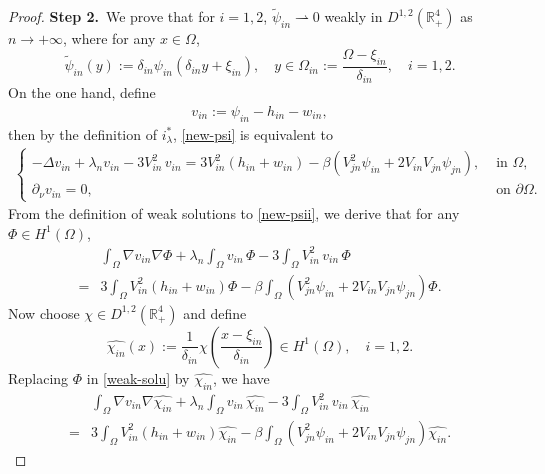 \documentclass[a4paper,reqno,11pt,oneside]{amsart}
\numberwithin{equation}{section}
\newcommand{\R}{\mathbb{R}}
\begin{document}
\begin{proof}
{\textbf{Step 2.}~We prove that  for $i=1,2$, \( \widetilde{\psi}_{in}\rightharpoonup 0 \) weakly in \(D^{1,2}(\R^4_{+})\) as $n \rightarrow+\infty$, where for any $x\in\Omega$,
$$
    \label{trans}\widetilde{\psi}_{in}(y):=\delta_{in}\psi_{in}\left(\delta_{in} y+\xi_{in}\right),\quad y\in\Omega_{in}:=\frac{\Omega-\xi_{in}}{\delta_{in}},\quad i=1,2.
$$ }
On the one hand, define \begin{align}
    \label{def-vn}v_{in}:=\psi_{in}-h_{in}-w_{in},
\end{align} then by the definition of $i^*_{\lambda}$, \eqref{new-psi} is equivalent to
\begin{align}\label{new-psii}
    \begin{cases}
-\Delta v_{in}+\lambda_n  v_{in}- 3V_{in}^2\,v_{in}=3V_{in}^2( h_{in}+w_{in})-\beta\left(V_{jn}^2\psi_{in}+2V_{in}V_{jn}\psi_{jn}\right), &\text{ in $\Omega$},\\
\partial_{\nu}v_{in}=0,&\text{ on $\partial\Omega$.}
\end{cases}
\end{align}
From the definition of weak solutions to \eqref{new-psii}, we derive that for any $\Phi\in H^{1}(\Omega)$, 
\begin{align}
    \label{weak-solu}
    &\displaystyle\int_{\Omega}\nabla v_{in}\nabla\Phi+\lambda_n\displaystyle\int_{\Omega}v_{in}\,\Phi -3\displaystyle\int_{\Omega}V_{in}^2\,v_{in}\,\Phi\nonumber\\=&3\displaystyle\int_{\Omega}V_{in}^2( h_{in}+w_{in})\Phi-\beta\displaystyle\int_{\Omega}\left(V_{jn}^2\psi_{in}+2V_{in}V_{jn}\psi_{jn}\right)\Phi.
\end{align}
Now  choose $\chi\in D^{1,2}(\R^4_+)$ and define $$\widehat{\chi_{in}}(x):=\frac{1}{\delta_{in}}\chi\left(\frac{x-\xi_{in}}{\delta_{in}}\right)\in H^{1}(\Omega),\quad i=1,2.$$
Replacing $\Phi$ in \eqref{weak-solu} by $\widehat{\chi_{in}}$, we have
\begin{align}
    \label{weak-solu-22}
   &\displaystyle\int_{\Omega}\nabla v_{in}\nabla\widehat{\chi_{in}}+\lambda_n\displaystyle\int_{\Omega}v_{in}\,\widehat{\chi_{in}} -3\displaystyle\int_{\Omega}V_{in}^2\,v_{in}\,\widehat{\chi_{in}}\nonumber\\=&3\displaystyle\int_{\Omega}V_{in}^2( h_{in}+w_{in})\widehat{\chi_{in}}-\beta\displaystyle\int_{\Omega}\left(V_{jn}^2\psi_{in}+2V_{in}V_{jn}\psi_{jn}\right)\widehat{\chi_{in}}.
\end{align}


\end{proof}
\end{document}
